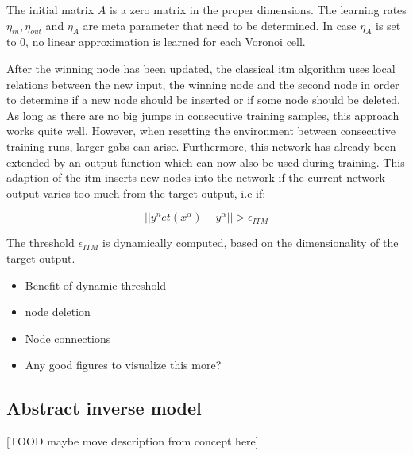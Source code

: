 The initial matrix $A$ is a zero matrix in the proper dimensions. The learning rates $\eta_{in}, \eta_{out}$ and $\eta_A$ are meta parameter that need to be determined. In case $\eta_A$ is set to 0, no linear approximation is learned for each Voronoi cell.

After the winning node has been updated, the classical \gls{itm} algorithm uses local relations between the new input, the winning node and the second node in order to determine if a new node should be inserted or if some node should be deleted. As long as there are no big jumps in consecutive training samples, this approach works quite well. However, when resetting the environment between consecutive training runs, larger gabs can arise. Furthermore, this network has already been extended by an output function which can now also be used during training. This adaption of the \gls{itm} inserts new nodes into the network if the current network output varies too much from the target output, i.e if:

\begin{equation}
||y^net(x^\alpha)-y^\alpha|| > \epsilon_{ITM}
\end{equation}

The threshold $\epsilon_{ITM}$ is dynamically computed, based on the dimensionality of the target output. %

\begin{itemize}
	\item Benefit of dynamic threshold
	\item node deletion
	\item Node connections
	\item Any good figures to visualize this more?
\end{itemize}

\subsection{Abstract inverse model}
[TOOD maybe move description from concept here]
